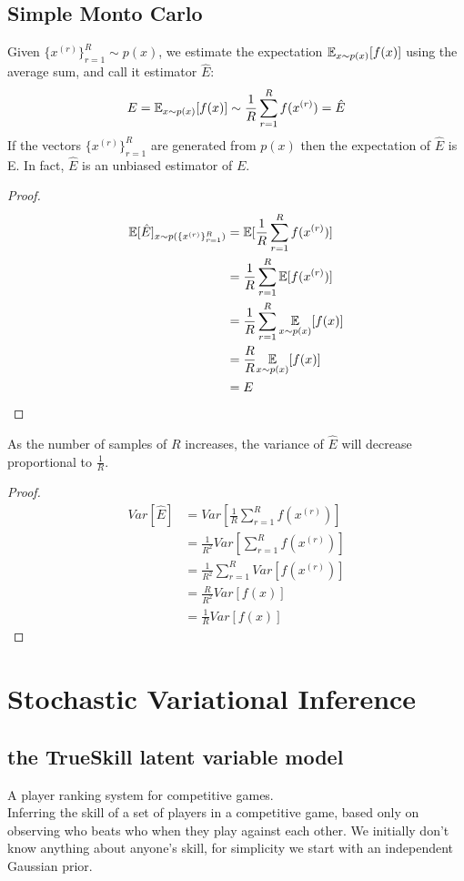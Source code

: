 \documentclass[11pt]{article}
\begin{document}
\subsection{Simple Monto Carlo}
Given $\{x^{(r)}\}_{r=1}^R \sim p(x)$, we estimate the expectation $\mathbb{E}_{x\sim p(x)}[f(x)]$ using the average sum, and call it estimator $\hat{E}$:
$$E = \mathbb{E}_{x\sim p(x)}[f(x)] \sim \frac{1}{R}\sum_{r=1}^R f(x^{(r)}) = \hat{E}$$
\property
If the vectors $\{x^{(r)}\}_{r=1}^R$ are generated from $p(x)$ then the expectation of $\hat{E}$ is E. In fact, $\hat{E}$ is an unbiased estimator of $E$.
\begin{proof}
\begin{align*}
	\mathbb{E}[{\hat{E}}]_{x\sim p(\{x^{(r)}\}_{r=1}^R)} &= \mathbb{E}[{\frac{1}{R}\sum_{r=1}^R f(x^{(r)})}]\\
	&= \frac{1}{R}\sum_{r=1}^R \mathbb{E}[{f(x^{(r)})}] \\
	&= \frac{1}{R} \sum_{r=1}^R \underset{x \sim p(x)}{\mathbb{E}}[f(x)]\\
	&= \frac{R}{R}  \underset{x \sim p(x)}{\mathbb{E}}[f(x)]\\
	&= E
\end{align*}
\end{proof}
\property
As the number of samples of $R$ increases, the variance of $\hat{E}$ will decrease proportional to $\frac{1}{R}$.
\begin{proof}
	\begin{align*}
		Var[\hat{E}] &= Var\left[\frac{1}{R} \sum_{r=1}^R f(x^{(r)})\right] \\
		&= \frac{1}{R^2}Var\left[\sum_{r=1}^R f(x^{(r)})\right]\\
		&= \frac{1}{R^2}\sum_{r=1}^R Var\left[ f(x^{(r)}) \right] \tag{by i.i.d. assumption}\\
		&= \frac{R}{R^2} Var[f(x)] \\
		&= \frac{1}{R} Var[f(x)]
	\end{align*}
\end{proof} 

\section{Stochastic Variational Inference}
\subsection{the TrueSkill latent variable model}
A player ranking system for competitive games.\\
Inferring the skill of a set of players in a competitive game, based only on observing who beats who when they play against each other.  We initially don't know anything about anyone's skill, for simplicity we start with an independent Gaussian prior.
\end{document}
